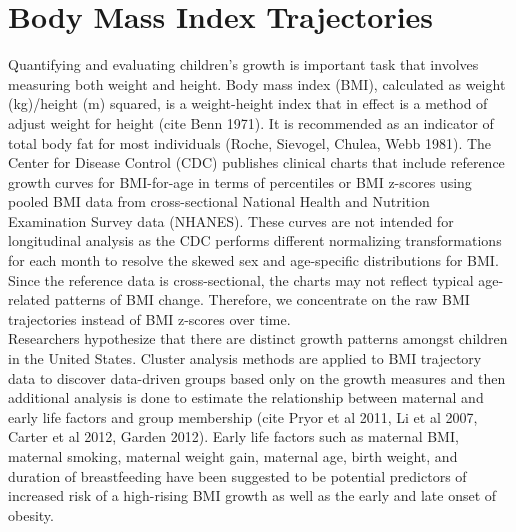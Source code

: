\documentclass[11pt]{article}
\begin{document}
\section{Body Mass Index Trajectories}
Quantifying and evaluating children's growth is important task that involves measuring both weight and height. Body mass index (BMI), calculated as weight (kg)/height (m) squared, is a weight-height index that in effect is a method of adjust weight for height (cite Benn 1971). It is recommended as an indicator of total body fat for most individuals (Roche, Sievogel, Chulea, Webb 1981). The Center for Disease Control (CDC) publishes clinical charts that include reference growth curves for BMI-for-age in terms of percentiles or BMI z-scores using pooled BMI data from cross-sectional National Health and Nutrition Examination Survey data (NHANES). These curves are not intended for longitudinal analysis as the CDC performs different normalizing transformations for each month to resolve the skewed sex and age-specific distributions for BMI. Since the reference data is cross-sectional, the charts may not reflect typical age-related patterns of BMI change. Therefore, we concentrate on the raw BMI trajectories instead of BMI z-scores over time.\\ 

Researchers hypothesize that there are distinct growth patterns amongst children in the United States. Cluster analysis methods are applied to BMI trajectory data to discover data-driven groups based only on the growth measures and then additional analysis is done to estimate the relationship between maternal and early life factors and group membership (cite Pryor et al 2011, Li et al 2007, Carter et al 2012, Garden 2012).  Early life factors such as maternal BMI, maternal smoking, maternal weight gain, maternal age, birth weight, and duration of breastfeeding have been suggested to be potential predictors of increased risk of a high-rising BMI growth as well as the early and late onset of obesity.
\end{document}
